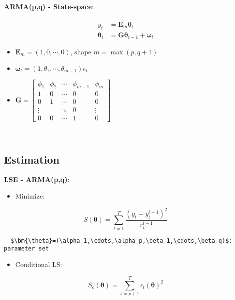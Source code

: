 \documentclass[
]{book}
\providecommand{\tightlist}{%
  \setlength{\itemsep}{0pt}\setlength{\parskip}{0pt}}
\begin{document}
~

\textbf{ARMA(p,q) - State-space}:

\begin{align*}
        y_t&=\bm{E}_m^\prime\bm{\theta}_t\\
        \bm{\theta}_t&=\bm{G}\bm{\theta}_{t-1}+\bm{\omega}_t
    \end{align*}

\begin{itemize}
\tightlist
\item
  \(\bm{E}_m=(1,0,\cdots,0)\), shape \(m=\max{(p,q+1)}\)
\item
  \(\bm{\omega}_t=(1,\theta_1,\cdots,\theta_{m-1})\epsilon_t\)
\item
  \(\bm{G}=\begin{bmatrix}\phi_1 & \phi_2 & \cdots & \phi_{m-1} & \phi_m \\ 1 & 0 & \cdots & 0 & 0 \\ 0 & 1 & \cdots & 0 & 0 \\ \vdots & & \ddots & 0 & \vdots \\ 0 & 0 & \cdots & 1 & 0\end{bmatrix}\)
\end{itemize}

~

\hypertarget{estimation-2}{%
\subsection{Estimation}\label{estimation-2}}

\textbf{LSE - ARMA(p,q)}:

\begin{itemize}
\tightlist
\item
  Minimize:
\end{itemize}

\[\begin{equation*}
        S(\bm{\theta})=\sum_{t=1}^{T}{\frac{(y_t-y_t^{t-1})^2}{r_t^{t-1}}}
    \end{equation*}\]

\begin{verbatim}
- $\bm{\theta}=(\alpha_1,\cdots,\alpha_p,\beta_1,\cdots,\beta_q)$: parameter set
\end{verbatim}

\begin{itemize}
\tightlist
\item
  Conditional LS:
\end{itemize}

\[\begin{equation*}
        S_c(\bm{\theta})=\sum_{t=p+1}^T{\epsilon_t(\bm{\theta})^2}
    \end{equation*}\]
\end{document}
